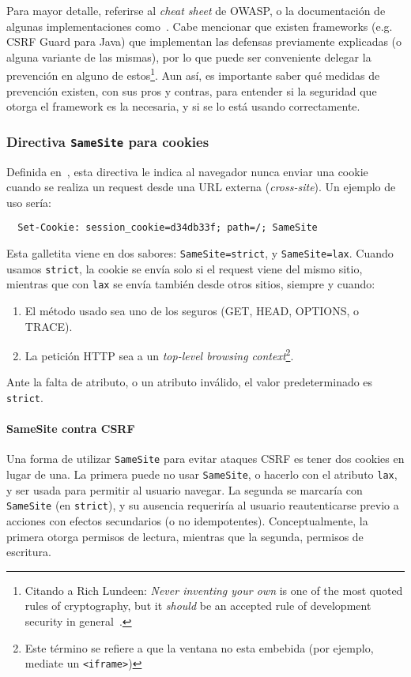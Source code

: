 \documentclass{article}
\theoremstyle{definition}
\begin{document}
Para mayor detalle, referirse al \textit{cheat sheet} de OWASP, o la
documentación de algunas implementaciones como~\cite{django, django2}. Cabe
mencionar que existen frameworks (e.g.  CSRF Guard para Java) que implementan
las defensas previamente explicadas (o alguna variante de las mismas), por lo
que puede ser conveniente delegar la prevención en alguno de
estos\footnote{Citando a Rich Lundeen: \textit{Never inventing your own} is one
of the most quoted rules of cryptography, but it \textit{should} be an accepted
rule of development security in general~\cite{Lundeen13}.}. Aun así, es importante saber qué
medidas de prevención existen, con sus pros y contras, para entender si la
seguridad que otorga el framework es la necesaria, y si se lo está usando
correctamente.



\subsubsection*{Directiva \texttt{SameSite} para cookies}
Definida en~\cite{ietf}, esta directiva le indica al navegador nunca enviar una cookie cuando se realiza
un request desde una URL externa (\textit{cross-site}). Un ejemplo de uso sería:
\begin{verbatim}
  Set-Cookie: session_cookie=d34db33f; path=/; SameSite
\end{verbatim}

Esta galletita viene en dos sabores: \verb+SameSite=strict+, y
\verb+SameSite=lax+. Cuando usamos \verb+strict+, la cookie se envía solo si el request viene del
mismo sitio, mientras que con \verb+lax+ se envía también desde otros sitios,
siempre y cuando:
\begin{enumerate}
  \item El método usado sea uno de los seguros (GET, HEAD, OPTIONS, o TRACE).
  \item La petición HTTP sea a un \textit{top-level browsing
    context}\footnote{Este término se refiere a que la ventana no esta embebida
(por ejemplo, mediate un \texttt{<iframe>})}.
\end{enumerate}
Ante la falta de atributo, o un atributo inválido, el valor predeterminado es
\verb+strict+.

%

\paragraph{SameSite contra CSRF} Una forma de utilizar \verb+SameSite+ para
evitar ataques CSRF es tener dos cookies en lugar de una. La primera puede no
usar \verb+SameSite+, o hacerlo con el atributo \verb+lax+, y ser usada para
permitir al usuario navegar. La segunda se marcaría con \verb+SameSite+ (en
\verb+strict+), y su ausencia requeriría al usuario reautenticarse previo a
acciones con efectos secundarios (o no idempotentes). Conceptualmente, la
primera otorga permisos de lectura, mientras que la segunda, permisos de
escritura.
\end{document}
